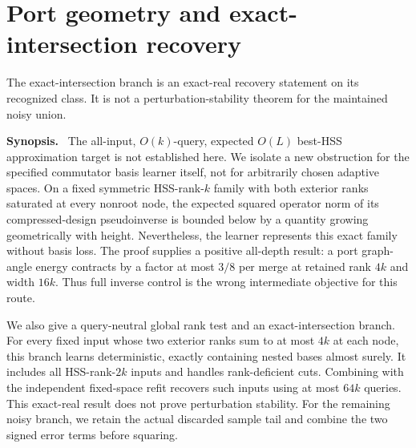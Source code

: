 \documentclass[11pt,oneside,openany,a4paper]{book}
\numberwithin{equation}{chapter}
\theoremstyle{definition}
\theoremstyle{remark}
\newenvironment{chaptersynopsis}{\begingroup\small\textbf{Synopsis.}\ }{\par\endgroup\medskip}
\newcommand{\R}{\mathbb R}\newcommand{\E}{\mathbb E}\newcommand{\Prb}{\mathbb P}\newcommand{\PP}{\mathbb P}
\newcommand{\F}[1]{\left\lVert#1\right\rVert_F}
\newcommand{\op}[1]{\left\lVert#1\right\rVert_{\rm op}}
\newcommand{\ip}[2]{\left\langle#1,#2\right\rangle_F}
\DeclareMathOperator{\tr}{tr}\DeclareMathOperator{\rank}{rank}
\DeclareMathOperator{\ran}{range}\DeclareMathOperator{\OPT}{OPT}
\newcommand{\HH}{\mathcal H}\newcommand{\SSS}{\mathcal S}
\begin{document}
\endgroup

\begingroup
\let\E\relax
\newcommand{\E}{\mathbb E}
\let\R\relax
\newcommand{\R}{\mathbb R}
\let\Id\relax
\newcommand{\Id}{\mathrm I}
\let\ran\relax
\newcommand{\ran}{\operatorname{range}}
\let\rank\relax
\newcommand{\rank}{\operatorname{rank}}
\let\tr\relax
\newcommand{\tr}{\operatorname{tr}}
\let\dist\relax
\newcommand{\dist}{\operatorname{dist}}
\let\OPT\relax
\newcommand{\OPT}{\operatorname{OPT}_k}
\let\HH\relax
\newcommand{\HH}{\mathcal H}
\let\SSS\relax
\newcommand{\SSS}{\mathcal S}
\let\F\relax
\newcommand{\F}[1]{\left\|#1\right\|_{\mathrm F}}
\let\op\relax
\newcommand{\op}[1]{\left\|#1\right\|_{\mathrm{op}}}
\let\ip\relax
\newcommand{\ip}[2]{\left\langle #1,#2\right\rangle}
\let\transpose\relax
\newcommand{\transpose}{\mathsf T}
\chapter{Port geometry and exact-intersection recovery}\label{ch:ports}
\begin{scopebox}
The exact-intersection branch is an exact-real recovery statement on its recognized class. It is not a perturbation-stability theorem for the maintained noisy union.
\end{scopebox}
\begin{chaptersynopsis}
The all-input, $O(k)$-query, expected $O(L)$ best-HSS approximation target is not established here. We isolate a new obstruction for the specified commutator basis learner itself, not for arbitrarily chosen adaptive spaces. On a fixed symmetric HSS-rank-$k$ family with both exterior ranks saturated at every nonroot node, the expected squared operator norm of its compressed-design pseudoinverse is bounded below by a quantity growing geometrically with height. Nevertheless, the learner represents this exact family without basis loss. The proof supplies a positive all-depth result: a port graph-angle energy contracts by a factor at most $3/8$ per merge at retained rank $4k$ and width $16k$. Thus full inverse control is the wrong intermediate objective for this route.

We also give a query-neutral global rank test and an exact-intersection branch. For every fixed input whose two exterior ranks sum to at most $4k$ at each node, this branch learns deterministic, exactly containing nested bases almost surely. It includes all HSS-rank-$2k$ inputs and handles rank-deficient cuts. Combining with the independent fixed-space refit recovers such inputs using at most $64k$ queries. This exact-real result does not prove perturbation stability. For the remaining noisy branch, we retain the actual discarded sample tail and combine the two signed error terms before squaring.
\end{chaptersynopsis}
\end{document}
